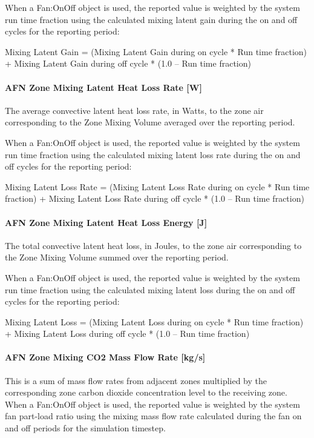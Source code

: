 When a Fan:OnOff object is used, the reported value is weighted by the system run time fraction using the calculated mixing latent gain during the on and off cycles for the reporting period:

Mixing Latent Gain = (Mixing Latent Gain during on cycle * Run time fraction) + Mixing Latent Gain during off cycle * (1.0 -- Run time fraction)

\paragraph{AFN Zone Mixing Latent Heat Loss Rate {[}W{]}}\label{afn-zone-mixing-latent-heat-loss-rate-w}

The average convective latent heat loss rate, in Watts, to the zone air corresponding to the Zone Mixing Volume averaged over the reporting period.

When a Fan:OnOff object is used, the reported value is weighted by the system run time fraction using the calculated mixing latent loss rate during the on and off cycles for the reporting period:

Mixing Latent Loss Rate = (Mixing Latent Loss Rate during on cycle * Run time fraction) + Mixing Latent Loss Rate during off cycle * (1.0 -- Run time fraction)

\paragraph{AFN Zone Mixing Latent Heat Loss Energy {[}J{]}}\label{afn-zone-mixing-latent-heat-loss-energy-j}

The total convective latent heat loss, in Joules, to the zone air corresponding to the Zone Mixing Volume summed over the reporting period.

When a Fan:OnOff object is used, the reported value is weighted by the system run time fraction using the calculated mixing latent loss during the on and off cycles for the reporting period:

Mixing Latent Loss = (Mixing Latent Loss during on cycle * Run time fraction) + Mixing Latent Loss during off cycle * (1.0 -- Run time fraction)

\paragraph{AFN Zone Mixing CO2 Mass Flow Rate {[}kg/s{]}}\label{afn-zone-mixing-co2-mass-flow-rate-kgs}

This is a sum of mass flow rates from adjacent zones multiplied by the corresponding zone carbon dioxide concentration level to the receiving zone. When a Fan:OnOff object is used, the reported value is weighted by the system fan part-load ratio using the mixing mass flow rate calculated during the fan on and off periods for the simulation timestep.

